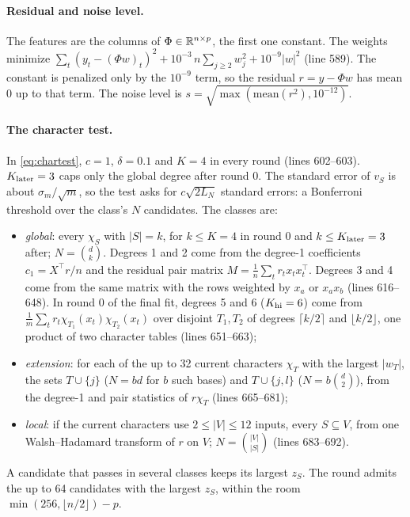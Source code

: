\paragraph{Residual and noise level.} The features are the columns of $\Phi\in\mathbb{R}^{n\times p}$, the first one constant. The weights minimize $\sum_t(y_t-(\Phi w)_t)^2+10^{-3}\,n\sum_{j\ge2}w_j^2+10^{-9}|w|^2$ (line 589). The constant is penalized only by the $10^{-9}$ term, so the residual $r=y-\Phi w$ has mean 0 up to that term. The noise level is $s=\sqrt{\max(\mathrm{mean}(r^2),10^{-12})}$.

\paragraph{The character test.} In \cref{eq:chartest}, $c=1$, $\delta=0.1$ and $K=4$ in every round (lines 602--603). $K_{\rm later}=3$ caps only the global degree after round 0. The standard error of $v_S$ is about $\sigma_m/\sqrt m$, so the test asks for $c\sqrt{2L_N}$ standard errors: a Bonferroni threshold over the class's $N$ candidates. The classes are:
\begin{itemize}
\item \emph{global}: every $\chi_S$ with $|S|=k$, for $k\le K=4$ in round 0 and $k\le K_{\rm later}=3$ after; $N=\binom dk$. Degrees 1 and 2 come from the degree-1 coefficients $c_1=X^\top r/n$ and the residual pair matrix $M=\frac1n\sum_tr_tx_tx_t^\top$. Degrees 3 and 4 come from the same matrix with the rows weighted by $x_a$ or $x_ax_b$ (lines 616--648). In round 0 of the final fit, degrees 5 and 6 ($K_{\rm hi}=6$) come from $\frac1m\sum_tr_t\chi_{T_1}(x_t)\chi_{T_2}(x_t)$ over disjoint $T_1,T_2$ of degrees $\lceil k/2\rceil$ and $\lfloor k/2\rfloor$, one product of two character tables (lines 651--663);
\item \emph{extension}: for each of the up to 32 current characters $\chi_T$ with the largest $|w_T|$, the sets $T\cup\{j\}$ ($N=bd$ for $b$ such bases) and $T\cup\{j,l\}$ ($N=b\binom d2$), from the degree-1 and pair statistics of $r\chi_T$ (lines 665--681);
\item \emph{local}: if the current characters use $2\le|V|\le12$ inputs, every $S\subseteq V$, from one Walsh--Hadamard transform of $r$ on $V$; $N=\binom{|V|}{|S|}$ (lines 683--692).
\end{itemize}
A candidate that passes in several classes keeps its largest $z_S$. The round admits the up to 64 candidates with the largest $z_S$, within the room $\min(256,\lfloor n/2\rfloor)-p$.

